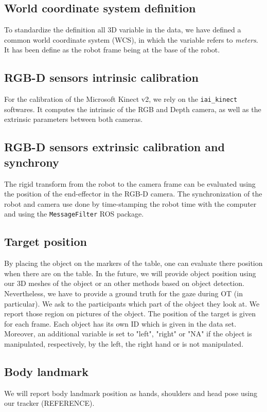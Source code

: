 \documentclass[11pt,a4paper]{article}
\begin{document}
\subsection{World coordinate system definition}
To standardize the definition all 3D variable in the data, we have defined a common world coordinate system (WCS), in which the variable refers to \textit{meters}. It has been define as the robot frame being at the base of the robot.

\subsection{RGB-D sensors intrinsic calibration}
For the calibration of the Microsoft Kinect v2, we rely on the \texttt{iai\_kinect} softwares. It computes the intrinsic of the RGB and Depth camera, as well as the extrinsic parameters between both cameras.

\subsection{RGB-D sensors extrinsic calibration and synchrony}
The rigid transform from the robot to the camera frame can be evaluated using the position of the end-effector in the RGB-D camera. The synchronization of the robot and camera use done by time-stamping the robot time with the computer and using the \texttt{MessageFilter} ROS package.

\subsection{Target position}
By placing the object on the markers of the table, one can evaluate there position when there are on the table. In the future, we will provide object position using our 3D meshes of the object or an other methods based on object detection. Nevertheless, we have to provide a ground truth for the gaze during OT (in particular). We ask to the participants which part of the object they look at. We report those region on pictures of the object. The position of the target is given for each frame. Each object has its own ID which is given in the data set. Moreover, an additional variable is set to "left", "right" or "NA" if the object is manipulated, respectively, by the left, the right hand or is not manipulated.

\subsection{Body landmark}
We will report body landmark position as hands, shoulders and head pose using our tracker (REFERENCE).
\end{document}

